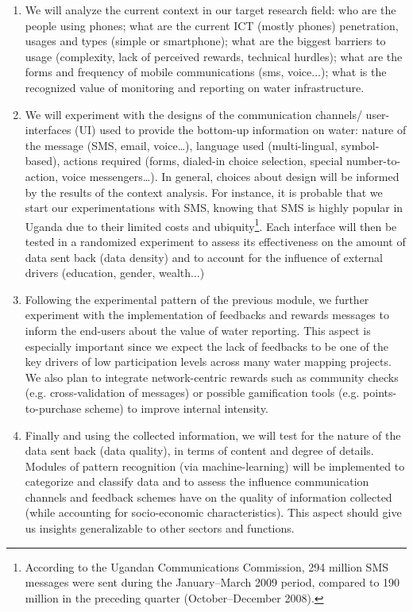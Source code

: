 \documentclass[11pt]{article}
\begin{document}
\begin{enumerate}
\item
We will analyze the current context in our target research field: who are the people using phones; what are the current ICT (mostly phones) penetration, usages and types (simple or smartphone); what are the biggest barriers to usage (complexity, lack of perceived rewards, technical hurdles); what are the forms and frequency of mobile communications (sms, voice...); what is the recognized value of monitoring and reporting on water infrastructure.
\item
We will experiment with the designs of the communication channels/ user-interfaces (UI) used to provide the bottom-up information on water: nature of the message (SMS, email, voice…), language used (multi-lingual, symbol-based), actions required (forms, dialed-in choice selection, special number-to-action, voice messengers…). In general, choices about design will be informed by the results of the context analysis. For instance, it is probable that we start our experimentations with SMS, knowing that SMS is highly popular in Uganda due to their limited costs and ubiquity\footnote{According to the Ugandan Communications Commission, 294 million SMS messages were sent during the January–March 2009 period, compared to 190 million in the preceding quarter (October–December 2008).}.
Each interface will then be tested in a randomized experiment to assess its effectiveness on the amount of data sent back (data density) and to account for the influence of external drivers (education, gender, wealth...)
\item
Following the experimental pattern of the previous module, we further experiment with the implementation of feedbacks and rewards messages to inform the end-users about the value of water reporting. 
This aspect is especially important since we expect the lack of feedbacks to be one of the key drivers of low participation levels across many water mapping projects.
We also plan to integrate network-centric rewards such as community checks (e.g. cross-validation of messages) or possible gamification tools (e.g. points-to-purchase scheme) to improve internal intensity. 
\item
Finally and using the collected information, we will test for the nature of the data sent back (data quality), in terms of content and degree of details. Modules of pattern recognition (via machine-learning) will be implemented to categorize and classify data and to assess the influence communication channels and feedback schemes have on the quality of information collected (while accounting for socio-economic characteristics). This aspect should give us insights generalizable to other sectors and functions.
\end{enumerate}  
\end{document}
